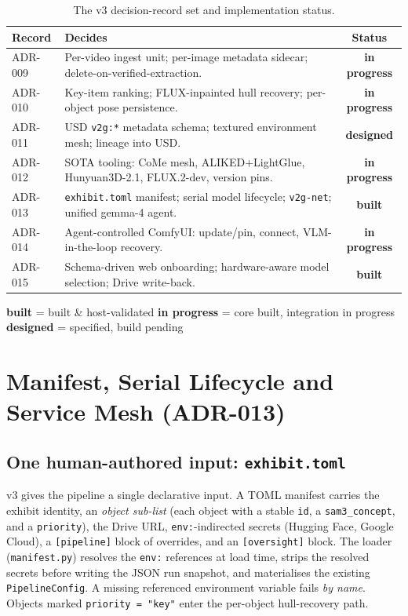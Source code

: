 \documentclass[a4paper,11pt]{report}
\newcommand{\chip}[2]{\textcolor{#1}{\textbf{#2}}}
\newcommand{\code}[1]{\texttt{#1}}
\newcommand{\built}{\chip{SuccessGreen}{built}}
\newcommand{\wip}{\chip{WarningAmber}{in progress}}
\newcommand{\designed}{\chip{MidGrey}{designed}}
\begin{document}
\begin{table}[h]
\centering\small
\caption{The v3 decision-record set and implementation status.}\label{tab:adrset}
\begin{tabularx}{\textwidth}{l L{0.58\textwidth} c}
\toprule
\textbf{Record} & \textbf{Decides} & \textbf{Status} \\
\midrule
ADR-009 & Per-video ingest unit; per-image metadata sidecar; delete-on-verified-extraction. & \wip{} \\
ADR-010 & Key-item ranking; FLUX-inpainted hull recovery; per-object pose persistence. & \wip{} \\
ADR-011 & USD \code{v2g:*} metadata schema; textured environment mesh; lineage into USD. & \designed{} \\
ADR-012 & SOTA tooling: CoMe mesh, ALIKED+LightGlue, Hunyuan3D-2.1, FLUX.2-dev, version pins. & \wip{} \\
ADR-013 & \code{exhibit.toml} manifest; serial model lifecycle; \code{v2g-net}; unified gemma-4 agent. & \built{} \\
ADR-014 & Agent-controlled ComfyUI: update/pin, connect, VLM-in-the-loop recovery. & \wip{} \\
ADR-015 & Schema-driven web onboarding; hardware-aware model selection; Drive write-back. & \built{} \\
\bottomrule
\end{tabularx}
\centering\par\smallskip
{\footnotesize\textcolor{MidGrey}{\built{} = built \& host-validated \quad \wip{} = core built, integration in progress \quad \designed{} = specified, build pending}}
\end{table}

\chapter{Manifest, Serial Lifecycle and Service Mesh (ADR-013)}

\section{One human-authored input: \texttt{exhibit.toml}}
v3 gives the pipeline a single declarative input. A TOML manifest carries the exhibit identity, an
\emph{object sub-list} (each object with a stable \code{id}, a \code{sam3\_concept}, and a
\code{priority}), the Drive URL, \code{env:}-indirected secrets (Hugging Face, Google Cloud), a
\code{[pipeline]} block of overrides, and an \code{[oversight]} block. The loader (\code{manifest.py})
resolves the \code{env:} references at load time, strips the resolved secrets before writing the JSON
run snapshot, and materialises the existing \code{PipelineConfig}. A missing referenced environment
variable fails \emph{by name}. Objects marked \code{priority = "key"} enter the per-object
hull-recovery path.
\end{document}

